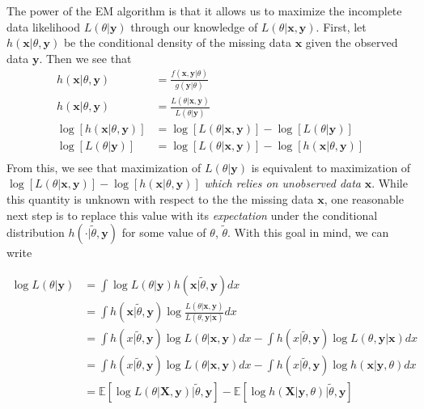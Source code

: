 \documentclass{article}
\newcommand{\E}{{\mathbb{E}}}
\begin{document}
The power of the EM algorithm is that it allows us to maximize the incomplete data likelihood $L(\theta|\mathbf{y})$ through our knowledge of $L(\theta|\mathbf{x}, \mathbf{y})$. First, let $h(\mathbf{x}|\theta,\mathbf{y})$ be the conditional density of the missing data $\mathbf{x}$ given the observed data $\mathbf{y}$. Then we see that 
\begin{align*}
h(\mathbf{x}|\theta,\mathbf{y}) &= \frac{f(\mathbf{x},\mathbf{y}|\theta)}{g(\mathbf{y}|\theta)}\\
h(\mathbf{x}|\theta,\mathbf{y}) &= \frac{L(\theta|\mathbf{x},\mathbf{y})}{L(\theta|\mathbf{y})}\\
\log\left[h(\mathbf{x}|\theta,\mathbf{y})\right] &= \log\left[L(\theta|\mathbf{x},\mathbf{y})\right]-\log\left[L(\theta|\mathbf{y})\right]\\
\log\left[L(\theta|\mathbf{y})\right] &= \log\left[L(\theta|\mathbf{x},\mathbf{y})\right]-\log\left[h(\mathbf{x}|\theta,\mathbf{y})\right]\\
\end{align*}
From this, we see that maximization of $L(\theta|\mathbf{y})$ is equivalent to maximization of $\log\left[L(\theta|\mathbf{x},\mathbf{y})\right]-\log\left[h(\mathbf{x}|\theta,\mathbf{y})\right]$ \textit{which relies on unobserved data} $\mathbf{x}$. While this quantity is unknown with respect to the the missing data $\mathbf{x}$, one reasonable next step is to replace this value with its \textit{expectation} under the conditional distribution $h(\cdot|\tilde{\theta}, \mathbf{y})$ for some value of $\theta$, $\tilde{\theta}$. With this goal in mind, we can write 

\begin{align*}
\log L(\theta|\mathbf{y}) &= \int \log L(\theta|\mathbf{y}) h(\mathbf{x}|\tilde{\theta},\mathbf{y})dx\\
&= \int h(\mathbf{x}|\tilde{\theta},\mathbf{y}) \log \frac{L(\theta|\mathbf{x},\mathbf{y})}{L(\theta, \mathbf{y}|\mathbf{x})} dx\\
&= \int h(x|\tilde{\theta},\mathbf{y})\log L(\theta|\mathbf{x},\mathbf{y})dx - \int h(x|\tilde{\theta},\mathbf{y})\log L(\theta,\mathbf{y}|\mathbf{x})dx\\
&= \int h(x|\tilde{\theta},\mathbf{y})\log L(\theta|\mathbf{x},\mathbf{y})dx - \int h(x|\tilde{\theta},\mathbf{y})\log h(\mathbf{x}|\mathbf{y},\theta)dx\\
&= \E\left[\log L(\theta|\mathbf{X},\mathbf{y})\big|\tilde{\theta},\mathbf{y}\right] - \E\left[\log h(\mathbf{X}|\mathbf{y},\theta)\big|\tilde{\theta},\mathbf{y}\right]
\end{align*}
\end{document}
